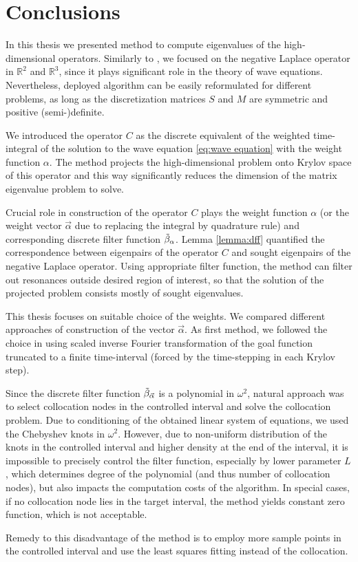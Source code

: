 \documentclass[a4paper,11pt,bibliography=totoc,listof=totoc,headinclude=true,cleardoublepage=empty,oneside]{scrbook}
\newcommand{\R}{\mathbb{R}}
\newcommand{\dff}{\Tilde{\beta}_\alpha}
\newcommand{\dffv}{\Tilde{\beta}_{\Vec{\alpha}}}
\begin{document}
\chapter{Conclusions}
In this thesis we presented method to compute eigenvalues of the high-dimensional operators. Similarly to \cite{nannen}, we focused on the negative Laplace operator in $\R^2$ and $\R^3$, since it plays significant role in the theory of wave equations. Nevertheless, deployed algorithm can be easily reformulated for different problems, as long as the discretization matrices $S$ and $M$ are symmetric and positive (semi-)definite. 

We introduced the operator $C$ as the discrete equivalent of the weighted time-integral of the solution to the wave equation \eqref{eq:wave equation} with the weight function $\alpha$. The method projects the high-dimensional problem onto Krylov space of this operator and this way significantly reduces the dimension of the matrix eigenvalue problem to solve. 

Crucial role in construction of the operator $C$ plays the weight function $\alpha$ (or the weight vector $\Vec{\alpha}$ due to replacing the integral by quadrature rule) and corresponding discrete filter function $\dff$. Lemma \ref{lemma:dff} quantified the correspondence between eigenpairs of the operator $C$ and sought eigenpairs of the negative Laplace operator. Using appropriate filter function, the method can filter out resonances outside desired region of interest, so that the solution of the projected problem consists mostly of sought eigenvalues. 

This thesis focuses on suitable choice of the weights. We compared different approaches of construction of the vector $\Vec{\alpha}$. As first method, we followed the choice in \cite{nannen} using scaled inverse Fourier transformation of the goal function truncated to a finite time-interval (forced by the time-stepping in each Krylov step). 

Since the discrete filter function $\dffv$ is a polynomial in $\omega^2$, natural approach was to select collocation nodes in the controlled interval and solve the collocation problem. Due to conditioning of the obtained linear system of equations, we used the Chebyshev knots in $\omega^2$. However, due to non-uniform distribution of the knots in the controlled interval and higher density at the end of the interval, it is impossible to precisely control the filter function, especially by lower parameter $L$, which determines degree of the polynomial (and thus number of collocation nodes), but also impacts the computation costs of the algorithm. In special cases, if no collocation node lies in the target interval, the method yields constant zero function, which is not acceptable.

Remedy to this disadvantage of the method is to employ more sample points in the controlled interval and use the least squares fitting instead of the collocation. 

 
%

\end{document}
